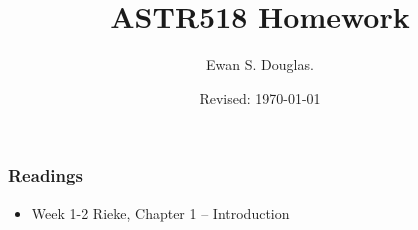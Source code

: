 \documentclass{beamer}
\title{ASTR518  Homework}
\author{Ewan S. Douglas. }
\date{Revised: \today}
\begin{document}
\frame{\titlepage}
\frame{\tableofcontents}
\frame
{
\frametitle{Readings}
\begin{itemize}
\item Week 1-2 Rieke, Chapter 1 -- Introduction
\end{itemize}
}




\end{document}
